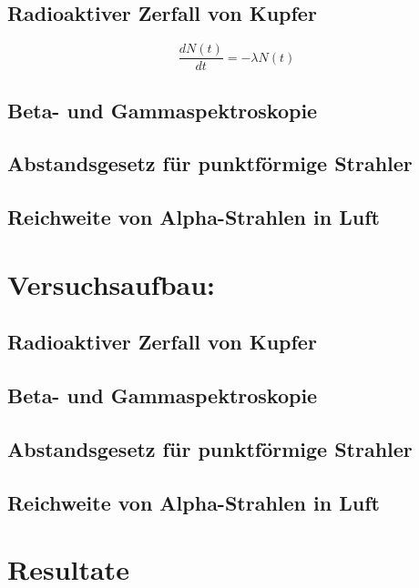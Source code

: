 \documentclass[12pt,a4paper]{article}
\begin{document}
\begin{multicols}{2}
\subsection{Radioaktiver Zerfall von Kupfer}
$$\frac{dN(t)}{dt} = -\lambda N(t)$$
\subsection{Beta- und Gammaspektroskopie}

\subsection{Abstandsgesetz für punktförmige Strahler}

\subsection{Reichweite von Alpha-Strahlen in Luft}


\pagebreak
\section{Versuchsaufbau:}



\subsection{Radioaktiver Zerfall von Kupfer}

\subsection{Beta- und Gammaspektroskopie}

\subsection{Abstandsgesetz für punktförmige Strahler}

\subsection{Reichweite von Alpha-Strahlen in Luft}


\pagebreak
\section{Resultate}

\end{multicols}
\end{document}
